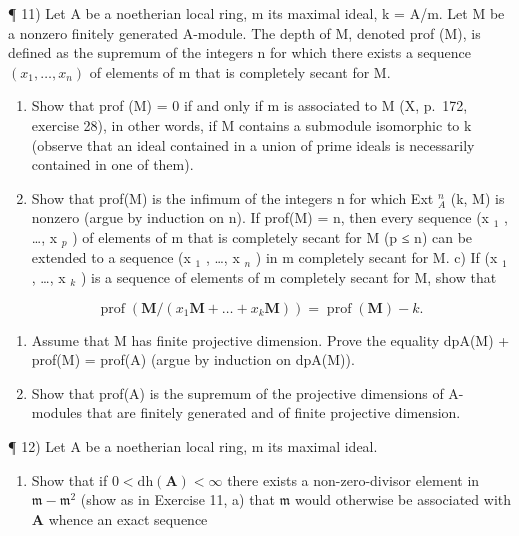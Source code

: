 ¶ 11) Let A be a noetherian local ring, m its maximal ideal, k = A/m. Let M be a nonzero finitely generated A-module. The depth of M, denoted prof (M), is defined as the supremum of the integers n for which there exists a sequence \((x_{1}, \ldots, x_{n})\) of elements of m that is completely secant for M.

\begin{enumerate}
\def\labelenumi{\alph{enumi})}
\item
  Show that prof (M) = 0 if and only if m is associated to M (X, p.~172, exercise 28), in other words, if M contains a submodule isomorphic to k (observe that an ideal contained in a union of prime ideals is necessarily contained in one of them).
\item
  Show that prof(M) is the infimum of the integers n for which Ext \(_{A}^{n}\) (k, M) is nonzero (argue by induction on n). If prof(M) = n, then every sequence (x \(_{1}\) , \ldots, x \(_{p}\) ) of elements of m that is completely secant for M (p ≤ n) can be extended to a sequence (x \(_{1}\) , \ldots, x \(_{n}\) ) in m completely secant for M. c) If (x \(_{1}\) , \ldots, x \(_{k}\) ) is a sequence of elements of m completely secant for M, show that
\end{enumerate}

\[
\operatorname{prof} \left(\mathbf {M} / (x _ {1} \mathbf {M} + \dots + x _ {k} \mathbf {M})\right) = \operatorname{prof} (\mathbf {M}) - k.
\]

\begin{enumerate}
\def\labelenumi{\alph{enumi})}
\setcounter{enumi}{3}
\item
  Assume that M has finite projective dimension. Prove the equality dpA(M) + prof(M) = prof(A) (argue by induction on dpA(M)).
\item
  Show that prof(A) is the supremum of the projective dimensions of A-modules that are finitely generated and of finite projective dimension.
\end{enumerate}

¶ 12) Let A be a noetherian local ring, m its maximal ideal.

\begin{enumerate}
\def\labelenumi{\alph{enumi})}
\tightlist
\item
  Show that if \(0 < \mathrm{dh}(\mathbf{A}) < \infty\) there exists a non-zero-divisor element in \(\mathfrak{m} - \mathfrak{m}^2\) (show as in Exercise 11, a) that \(\mathfrak{m}\) would otherwise be associated with \(\mathbf{A}\) whence an exact sequence
\end{enumerate}

